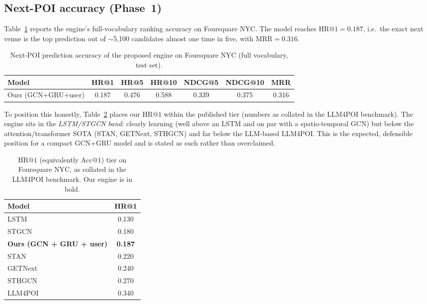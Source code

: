 \subsection{Next-POI accuracy (Phase~1)}
\label{sec:sol-results-nextpoi}

Table~\ref{tab:nextpoi} reports the engine's full-vocabulary ranking accuracy on Foursquare
NYC. The model reaches $\mathrm{HR@}1=0.187$, i.e.\ the exact next venue is the top prediction
out of $\sim$5{,}100 candidates almost one time in five, with $\mathrm{MRR}=0.316$.

\begin{table}[ht]
\centering
\caption{Next-POI prediction accuracy of the proposed engine on Foursquare NYC
(full vocabulary, test set).}
\label{tab:nextpoi}
\begin{tabular}{lcccccc}
\toprule
Model & HR@1 & HR@5 & HR@10 & NDCG@5 & NDCG@10 & MRR \\
\midrule
Ours (GCN+GRU+user) & 0.187 & 0.476 & 0.588 & 0.339 & 0.375 & 0.316 \\
\bottomrule
\end{tabular}
\end{table}

To position this honestly, Table~\ref{tab:nextpoi-tier} places our $\mathrm{HR@}1$ within the
published tier (numbers as collated in the LLM4POI benchmark). The engine sits in the
\emph{LSTM/STGCN band}: clearly learning (well above an LSTM and on par with a spatio-temporal
GCN) but below the attention/transformer SOTA (STAN, GETNext, STHGCN) and far below the
LLM-based LLM4POI. This is the expected, defensible position for a compact GCN+GRU model and is
stated as such rather than overclaimed.

\begin{table}[ht]
\centering
\caption{$\mathrm{HR@}1$ (equivalently $\mathrm{Acc@}1$) tier on Foursquare NYC, as collated in
the LLM4POI benchmark. Our engine is in bold.}
\label{tab:nextpoi-tier}
\begin{tabular}{lc}
\toprule
Model & HR@1 \\
\midrule
LSTM & 0.130 \\
STGCN~\cite{yu2018stgcn} & 0.180 \\
\textbf{Ours (GCN + GRU + user)} & \textbf{0.187} \\
STAN~\cite{luo2021stan} & 0.220 \\
GETNext~\cite{yang2022getnext} & 0.240 \\
STHGCN~\cite{yan2023sthgcn} & 0.270 \\
LLM4POI~\cite{li2024llm4poi} & 0.340 \\
\bottomrule
\end{tabular}
\end{table}

